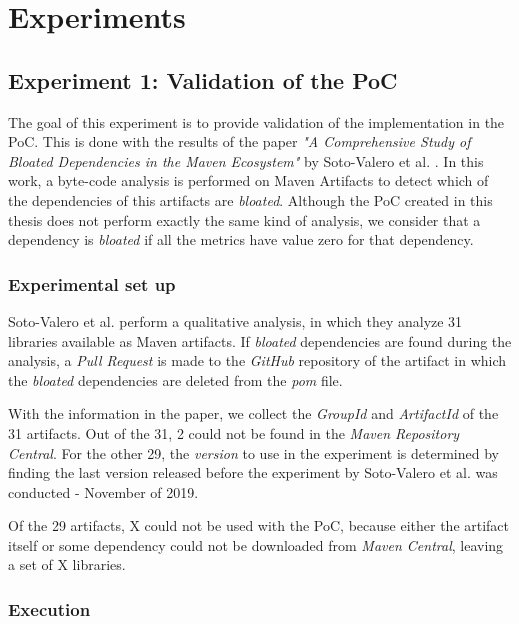 \chapter{Experiments}\label{ch:Experiments}

\section{Experiment 1: Validation of the PoC}
The goal of this experiment is to provide validation of the implementation in the PoC. This is done with the results of the paper \textit{"A Comprehensive Study of Bloated Dependencies in the Maven Ecosystem"} by Soto-Valero et al. \cite{soto2020comprehensive}. In this work, a byte-code analysis is performed on Maven Artifacts to detect which of the dependencies of this artifacts are \textit{bloated}. Although the PoC created in this thesis does not perform exactly the same kind of analysis, we consider that a dependency is \textit{bloated} if all the metrics have value zero for that dependency.

\subsection{Experimental set up}
Soto-Valero et al. perform a qualitative analysis, in which they analyze 31 libraries available as Maven artifacts. If \textit{bloated} dependencies are found during the analysis, a \textit{Pull Request} is made to the \textit{GitHub} repository of the artifact in which the \textit{bloated} dependencies are deleted from the \textit{pom} file.

With the information in the paper, we collect the \textit{GroupId} and \textit{ArtifactId} of the 31 artifacts. Out of the 31, 2 could not be found in the \textit{Maven Repository Central}. For the other 29, the \textit{version} to use in the experiment is determined by finding the last version released before the experiment by Soto-Valero et al. was conducted - November of 2019.

Of the 29 artifacts, X could not be used with the PoC, because either the artifact itself or some dependency could not be downloaded from \textit{Maven Central}, leaving a set of X  libraries.

\subsection{Execution}


